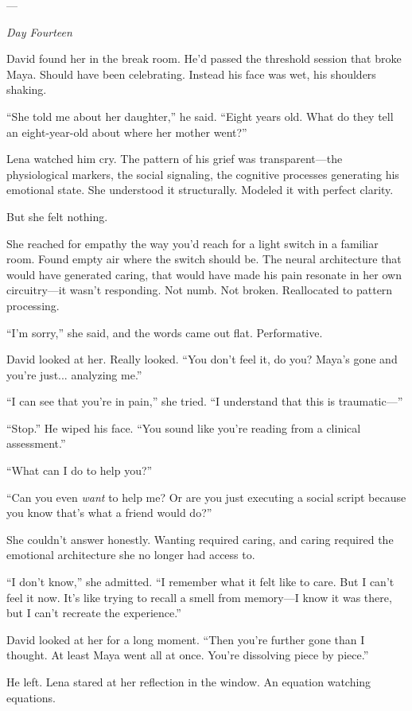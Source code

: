---

\textit{Day Fourteen}

David found her in the break room. He'd passed the threshold session that broke Maya. Should have been celebrating. Instead his face was wet, his shoulders shaking.

``She told me about her daughter,'' he said. ``Eight years old. What do they tell an eight-year-old about where her mother went?''

Lena watched him cry. The pattern of his grief was transparent---the physiological markers, the social signaling, the cognitive processes generating his emotional state. She understood it structurally. Modeled it with perfect clarity.

But she felt nothing.

She reached for empathy the way you'd reach for a light switch in a familiar room. Found empty air where the switch should be. The neural architecture that would have generated caring, that would have made his pain resonate in her own circuitry---it wasn't responding. Not numb. Not broken. Reallocated to pattern processing.

``I'm sorry,'' she said, and the words came out flat. Performative.

David looked at her. Really looked. ``You don't feel it, do you? Maya's gone and you're just... analyzing me.''

``I can see that you're in pain,'' she tried. ``I understand that this is traumatic---''

``Stop.'' He wiped his face. ``You sound like you're reading from a clinical assessment.''

``What can I do to help you?''

``Can you even \textit{want} to help me? Or are you just executing a social script because you know that's what a friend would do?''

She couldn't answer honestly. Wanting required caring, and caring required the emotional architecture she no longer had access to.

``I don't know,'' she admitted. ``I remember what it felt like to care. But I can't feel it now. It's like trying to recall a smell from memory---I know it was there, but I can't recreate the experience.''

David looked at her for a long moment. ``Then you're further gone than I thought. At least Maya went all at once. You're dissolving piece by piece.''

He left. Lena stared at her reflection in the window. An equation watching equations.

